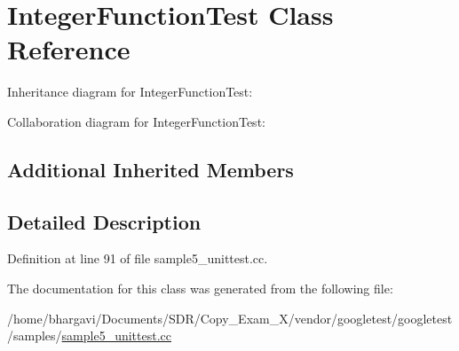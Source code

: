 \hypertarget{class_integer_function_test}{}\section{Integer\+Function\+Test Class Reference}
\label{class_integer_function_test}


Inheritance diagram for Integer\+Function\+Test\+:


Collaboration diagram for Integer\+Function\+Test\+:
\subsection*{Additional Inherited Members}


\subsection{Detailed Description}


Definition at line 91 of file sample5\+\_\+unittest.\+cc.



The documentation for this class was generated from the following file\+:\begin{DoxyCompactItemize}
\item 
/home/bhargavi/\+Documents/\+S\+D\+R/\+Copy\+\_\+\+Exam\+\_\+X/vendor/googletest/googletest/samples/\hyperlink{sample5__unittest_8cc}{sample5\+\_\+unittest.\+cc}\end{DoxyCompactItemize}
